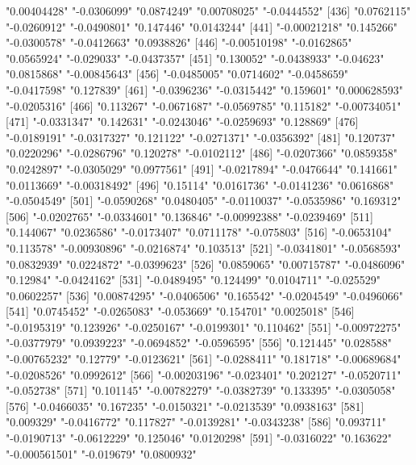 \begin{Schunk}
\begin{Soutput}
[431] "0.00404428"   "-0.0306099"   "0.0874249"    "0.00708025"   "-0.0444552"  
[436] "0.0762115"    "-0.0260912"   "-0.0490801"   "0.147446"     "0.0143244"   
[441] "-0.00021218"  "0.145266"     "-0.0300578"   "-0.0412663"   "0.0938826"   
[446] "-0.00510198"  "-0.0162865"   "0.0565924"    "-0.029033"    "-0.0437357"  
[451] "0.130052"     "-0.0438933"   "-0.04623"     "0.0815868"    "-0.00845643" 
[456] "-0.0485005"   "0.0714602"    "-0.0458659"   "-0.0417598"   "0.127839"    
[461] "-0.0396236"   "-0.0315442"   "0.159601"     "0.000628593"  "-0.0205316"  
[466] "0.113267"     "-0.0671687"   "-0.0569785"   "0.115182"     "-0.00734051" 
[471] "-0.0331347"   "0.142631"     "-0.0243046"   "-0.0259693"   "0.128869"    
[476] "-0.0189191"   "-0.0317327"   "0.121122"     "-0.0271371"   "-0.0356392"  
[481] "0.120737"     "0.0220296"    "-0.0286796"   "0.120278"     "-0.0102112"  
[486] "-0.0207366"   "0.0859358"    "0.0242897"    "-0.0305029"   "0.0977561"   
[491] "-0.0217894"   "-0.0476644"   "0.141661"     "0.0113669"    "-0.00318492" 
[496] "0.15114"      "0.0161736"    "-0.0141236"   "0.0616868"    "-0.0504549"  
[501] "-0.0590268"   "0.0480405"    "-0.0110037"   "-0.0535986"   "0.169312"    
[506] "-0.0202765"   "-0.0334601"   "0.136846"     "-0.00992388"  "-0.0239469"  
[511] "0.144067"     "0.0236586"    "-0.0173407"   "0.0711178"    "-0.075803"   
[516] "-0.0653104"   "0.113578"     "-0.00930896"  "-0.0216874"   "0.103513"    
[521] "-0.0341801"   "-0.0568593"   "0.0832939"    "0.0224872"    "-0.0399623"  
[526] "0.0859065"    "0.00715787"   "-0.0486096"   "0.12984"      "-0.0424162"  
[531] "-0.0489495"   "0.124499"     "0.0104711"    "-0.025529"    "0.0602257"   
[536] "0.00874295"   "-0.0406506"   "0.165542"     "-0.0204549"   "-0.0496066"  
[541] "0.0745452"    "-0.0265083"   "-0.053669"    "0.154701"     "0.0025018"   
[546] "-0.0195319"   "0.123926"     "-0.0250167"   "-0.0199301"   "0.110462"    
[551] "-0.00972275"  "-0.0377979"   "0.0939223"    "-0.0694852"   "-0.0596595"  
[556] "0.121445"     "0.028588"     "-0.00765232"  "0.12779"      "-0.0123621"  
[561] "-0.0288411"   "0.181718"     "-0.00689684"  "-0.0208526"   "0.0992612"   
[566] "-0.00203196"  "-0.023401"    "0.202127"     "-0.0520711"   "-0.052738"   
[571] "0.101145"     "-0.00782279"  "-0.0382739"   "0.133395"     "-0.0305058"  
[576] "-0.0466035"   "0.167235"     "-0.0150321"   "-0.0213539"   "0.0938163"   
[581] "0.009329"     "-0.0416772"   "0.117827"     "-0.0139281"   "-0.0343238"  
[586] "0.093711"     "-0.0190713"   "-0.0612229"   "0.125046"     "0.0120298"   
[591] "-0.0316022"   "0.163622"     "-0.000561501" "-0.019679"    "0.0800932"   

\end{Soutput}
\end{Schunk}
